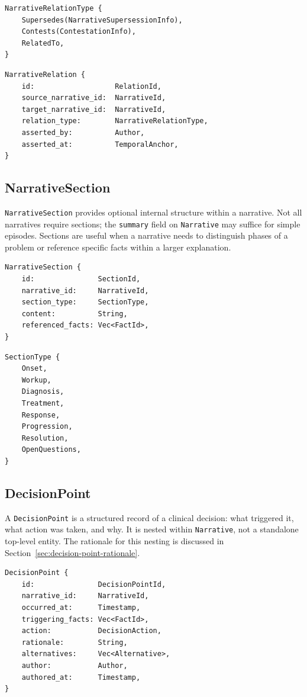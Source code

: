 \documentclass[11pt]{article}
\begin{document}
\begin{lstlisting}
NarrativeRelationType {
    Supersedes(NarrativeSupersessionInfo),
    Contests(ContestationInfo),
    RelatedTo,
}
\end{lstlisting}
\begin{lstlisting}
NarrativeRelation {
    id:                   RelationId,
    source_narrative_id:  NarrativeId,
    target_narrative_id:  NarrativeId,
    relation_type:        NarrativeRelationType,
    asserted_by:          Author,
    asserted_at:          TemporalAnchor,
}
\end{lstlisting}
\subsection{NarrativeSection}

\texttt{NarrativeSection} provides optional internal structure within a
narrative. Not all narratives require sections; the \texttt{summary} field
on \texttt{Narrative} may suffice for simple episodes. Sections are useful
when a narrative needs to distinguish phases of a problem or reference
specific facts within a larger explanation.

\begin{lstlisting}
NarrativeSection {
    id:               SectionId,
    narrative_id:     NarrativeId,
    section_type:     SectionType,
    content:          String,
    referenced_facts: Vec<FactId>,
}
\end{lstlisting}

\begin{lstlisting}
SectionType {
    Onset,
    Workup,
    Diagnosis,
    Treatment,
    Response,
    Progression,
    Resolution,
    OpenQuestions,
}
\end{lstlisting}

\subsection{DecisionPoint}

A \texttt{DecisionPoint} is a structured record of a clinical decision: what
triggered it, what action was taken, and why. It is nested within
\texttt{Narrative}, not a standalone top-level entity. The rationale for this
nesting is discussed in Section~\ref{sec:decision-point-rationale}.

\begin{lstlisting}
DecisionPoint {
    id:               DecisionPointId,
    narrative_id:     NarrativeId,
    occurred_at:      Timestamp,
    triggering_facts: Vec<FactId>,
    action:           DecisionAction,
    rationale:        String,
    alternatives:     Vec<Alternative>,
    author:           Author,
    authored_at:      Timestamp,
}
\end{lstlisting}
\end{document}

